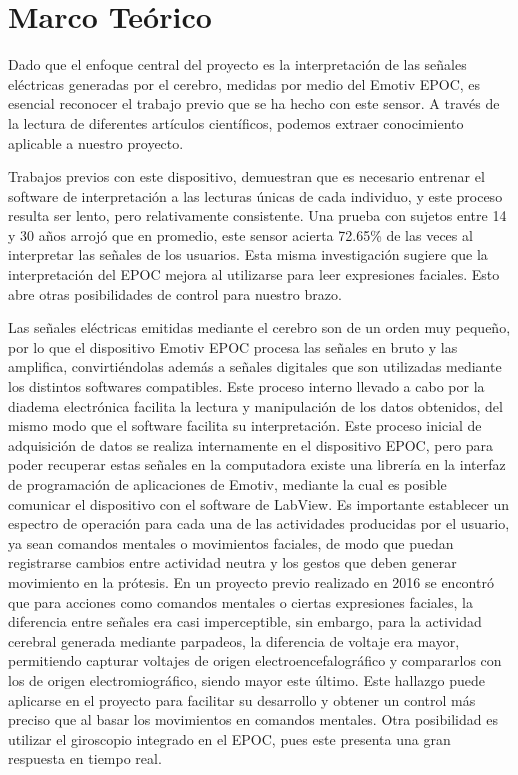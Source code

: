 \chapter{Marco Teórico}
Dado que el enfoque central del proyecto es la interpretación de las señales eléctricas generadas por el cerebro, medidas por medio del Emotiv EPOC, es esencial reconocer el trabajo previo que se ha hecho con este sensor. A través de la lectura de diferentes artículos científicos, podemos extraer conocimiento aplicable a nuestro proyecto.

Trabajos previos con este dispositivo, demuestran que es necesario entrenar el software de interpretación a las lecturas únicas de cada individuo, y este proceso resulta ser lento, pero relativamente consistente. Una prueba con sujetos entre 14 y 30 años arrojó que en promedio, este sensor acierta 72.65\% de las veces al interpretar las señales de los usuarios. Esta misma investigación sugiere que la interpretación del EPOC mejora al utilizarse para leer expresiones faciales. Esto abre otras posibilidades de control para nuestro brazo.

Las señales eléctricas emitidas mediante el cerebro son de un orden muy pequeño, por lo que el dispositivo Emotiv EPOC procesa las señales en bruto y las amplifica, convirtiéndolas además a señales digitales que son utilizadas mediante los distintos softwares compatibles. Este proceso interno llevado a cabo por la diadema electrónica facilita la lectura y manipulación de los datos obtenidos, del mismo modo que el software facilita su interpretación. 
Este proceso inicial de adquisición de datos se realiza internamente en el dispositivo EPOC, pero para poder recuperar estas señales en la computadora existe una librería en la interfaz de programación de aplicaciones de Emotiv, mediante la cual es posible comunicar el dispositivo con el software de LabView. 
Es importante establecer un espectro de operación para cada una de las actividades producidas por el usuario, ya sean comandos mentales o movimientos faciales, de modo que puedan registrarse cambios entre actividad neutra y los gestos que deben generar movimiento en la prótesis. En un proyecto previo realizado en 2016 se encontró que para acciones como comandos mentales o ciertas expresiones faciales, la diferencia entre señales era casi imperceptible, sin embargo, para la actividad cerebral generada mediante parpadeos, la diferencia de voltaje era mayor, permitiendo capturar voltajes de origen electroencefalográfico y compararlos con los de origen electromiográfico, siendo mayor este último. Este hallazgo puede aplicarse en el proyecto para facilitar su desarrollo y obtener un control más preciso que al basar los movimientos en comandos mentales. Otra posibilidad es utilizar el giroscopio integrado en el EPOC, pues este presenta una gran respuesta en tiempo real. 














